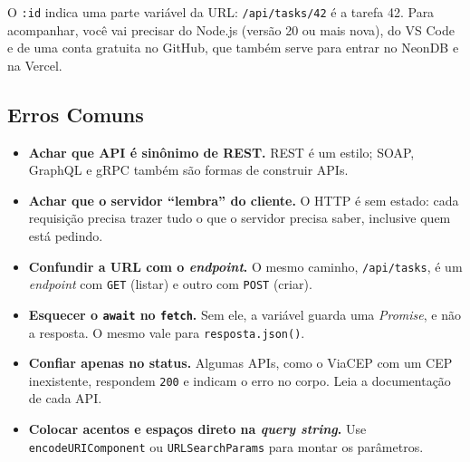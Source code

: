 O \texttt{:id} indica uma parte variável da URL: \texttt{/api/tasks/42} é a tarefa 42. Para acompanhar, você vai precisar do Node.js (versão 20 ou mais nova), do VS Code e de uma conta gratuita no GitHub, que também serve para entrar no NeonDB e na Vercel.

\subsection{Erros Comuns}

\begin{itemize}
  \item \textbf{Achar que API é sinônimo de REST.} REST é um estilo; SOAP, GraphQL e gRPC também são formas de construir APIs.
  \item \textbf{Achar que o servidor ``lembra'' do cliente.} O HTTP é sem estado: cada requisição precisa trazer tudo o que o servidor precisa saber, inclusive quem está pedindo.
  \item \textbf{Confundir a URL com o \textit{endpoint}.} O mesmo caminho, \texttt{/api/tasks}, é um \textit{endpoint} com \texttt{GET} (listar) e outro com \texttt{POST} (criar).
  \item \textbf{Esquecer o \texttt{await} no \texttt{fetch}.} Sem ele, a variável guarda uma \textit{Promise}, e não a resposta. O mesmo vale para \texttt{resposta.json()}.
  \item \textbf{Confiar apenas no status.} Algumas APIs, como o ViaCEP com um CEP inexistente, respondem \texttt{200} e indicam o erro no corpo. Leia a documentação de cada API.
  \item \textbf{Colocar acentos e espaços direto na \textit{query string}.} Use \texttt{encodeURIComponent} ou \texttt{URLSearchParams} para montar os parâmetros.
\end{itemize}
